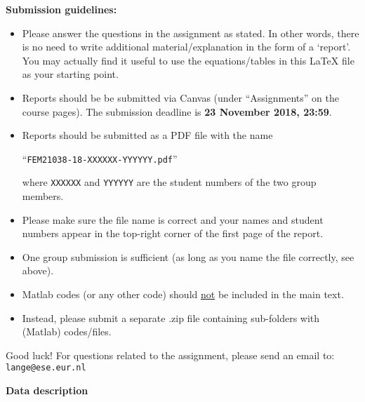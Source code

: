 \documentclass[12pt, a4paper]{article}
\begin{document}
\textbf{Submission guidelines:} 
\begin{itemize}
\item Please answer the questions in the assignment as stated. In other words, there is no need to write additional material/explanation in the form of a `report'. You may actually find it useful to use the equations/tables in this LaTeX file as your starting point. 
\item Reports should be be submitted via Canvas (under ``Assignments'' on the course pages). The submission deadline is \textbf{23 November 2018, 23:59}. 

\item Reports should be submitted as a PDF file with the name  
\begin{center}
``\texttt{FEM21038-18-XXXXXX-YYYYYY.pdf}''
\end{center}
\noindent where \texttt{XXXXXX} and
\texttt{YYYYYY} are the student numbers of the two group members.\newline
\vspace{-6mm}
\item Please make sure the file name is correct and your names and student numbers appear in the top-right corner of the first page of the report. 

\item One group submission is sufficient (as long as you name the file correctly, see above).

\item Matlab codes (or any other code) should \underline{not} be included in the main text.

\item Instead, please submit a separate .zip file containing sub-folders with (Matlab) codes/files.

\end{itemize}

\medskip\noindent Good luck! For questions related to the assignment, please send an email to:
\\
\texttt{lange@ese.eur.nl}

\clearpage

\noindent \textbf{Data description}
\end{document}
